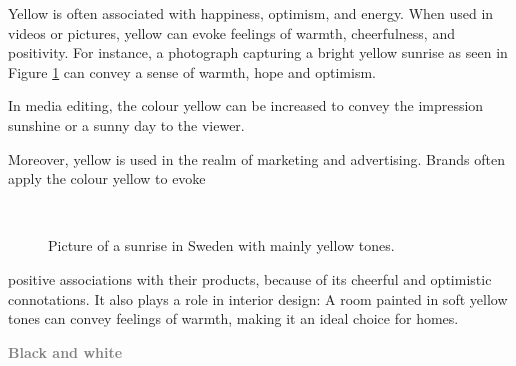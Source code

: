 \documentclass[../MasterThesis.tex]{subfiles}
\begin{document}
%
%
\begin{minipage}{0.45\textwidth}
	Yellow is often associated with happiness, optimism, and energy. When used in videos or pictures, yellow can evoke feelings of warmth, cheerfulness, and positivity. For instance, a photograph capturing a bright yellow sunrise as seen in Figure \ref{figure:yellow} can convey a sense of warmth, hope and optimism.
	
	In media editing, the colour yellow can be increased to convey the impression sunshine or a sunny day to the viewer.
	
	Moreover, yellow is used in the realm of marketing and advertising. Brands often apply the colour yellow to evoke 
	
	
\end{minipage}\begin{minipage}{0.05\textwidth}
	\ 
\end{minipage}\begin{minipage}{0.5\textwidth}
	\begin{figure}[H]
		\begin{center}
			\caption[Picture of a sunrise in Sweden with mainly yellow tones.]{Picture of a sunrise in Sweden with mainly yellow tones.}
			\label{figure:yellow}
		\end{center}
	\end{figure}\hfill
\end{minipage}

\vspace*{-0.6em}
positive associations with their products, because of its cheerful and optimistic connotations. It also plays a role in interior design: A room painted in soft yellow tones can convey feelings of warmth, making it an ideal choice for homes.~\cite{colour2}





\textbf{\textcolor{gray}{Black and white}}
\end{document}
